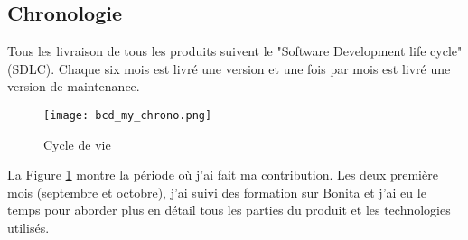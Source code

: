 \subsection{Chronologie}
Tous les livraison de tous les produits suivent le "Software Development life cycle" (SDLC). Chaque six mois est livré une version et une fois par mois est livré une version de maintenance.

\begin{figure}[!ht]
\centering
\texttt{[image: bcd\_my\_chrono.png]}
\caption{Cycle de vie}
\label{bcd_my_chrono}
\end{figure}

La Figure \ref{bcd_my_chrono} montre la période où j'ai fait ma contribution. Les deux première mois (septembre et octobre), j'ai suivi des formation sur Bonita et j'ai eu le temps pour aborder plus en détail tous les parties du produit et les technologies utilisés.
